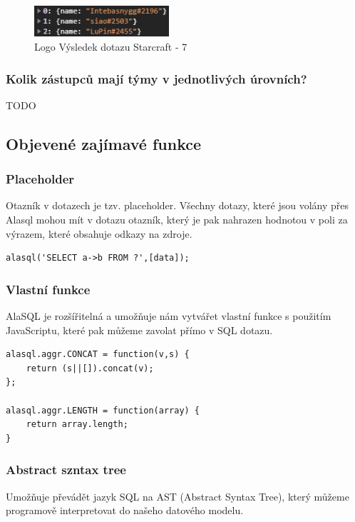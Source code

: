 \documentclass[a4, titlepage]{article}
\begin{document}
\begin{figure}[h]
    \centering
    \includegraphics[width=5cm]{S7}
    \caption{Logo Výsledek dotazu Starcraft - 7}
\end{figure} 

\subsubsection{Kolik zástupců mají týmy v jednotlivých úrovních?}
TODO

\subsection{Objevené zajímavé funkce}
\subsubsection*{Placeholder}
Otazník v dotazech je tzv. placeholder. Všechny dotazy, které jsou volány přes Alasql mohou mít v dotazu otazník, který je pak nahrazen hodnotou v poli za výrazem, které obsahuje odkazy na zdroje.

\begin{lstlisting}
alasql('SELECT a->b FROM ?',[data]);
\end{lstlisting}

\subsubsection*{Vlastní funkce}
AlaSQL je rozšířitelná a umožňuje nám vytvářet vlastní funkce s použitím JavaScriptu, které pak můžeme zavolat přímo v SQL dotazu.

\begin{lstlisting}
alasql.aggr.CONCAT = function(v,s) {
    return (s||[]).concat(v);
};

alasql.aggr.LENGTH = function(array) {
	return array.length;
}
\end{lstlisting}

\subsubsection*{Abstract szntax tree}
Umožňuje převádět jazyk SQL na AST (Abstract Syntax Tree), který můžeme programově interpretovat do našeho datového modelu.
\end{document}
